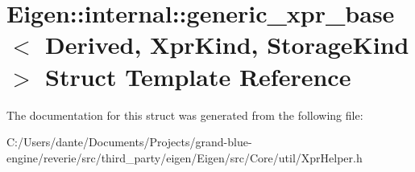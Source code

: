 \hypertarget{struct_eigen_1_1internal_1_1generic__xpr__base}{}\section{Eigen\+::internal\+::generic\+\_\+xpr\+\_\+base$<$ Derived, Xpr\+Kind, Storage\+Kind $>$ Struct Template Reference}
\label{struct_eigen_1_1internal_1_1generic__xpr__base}


The documentation for this struct was generated from the following file\+:\begin{DoxyCompactItemize}
\item 
C\+:/\+Users/dante/\+Documents/\+Projects/grand-\/blue-\/engine/reverie/src/third\+\_\+party/eigen/\+Eigen/src/\+Core/util/Xpr\+Helper.\+h\end{DoxyCompactItemize}
